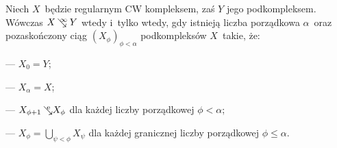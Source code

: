 \begin{lem}\label{lem-charakteryzacja_inf_zgniatalnosci}
Niech $X$~będzie regularnym CW kompleksem, zaś $Y$ jego podkompleksem. Wówczas $X\infcoll Y$ wtedy i~tylko wtedy, gdy istnieją liczba porządkowa $\alpha$~oraz pozaskończony ciąg $\left(X_\phi\right)_{\phi<\alpha}$ podkompleksów $X$~takie, że:
\begin{compactitem}
\item[---] $X_0=Y$;
\item[---] $X_\alpha=X$;
\item[---] $X_{\phi+1}\mbox{$\hspace{2pt}\searrow\hspace{-9pt}^\mathrm{e}\hspace{2pt}$} X_{\phi}$ dla każdej liczby porządkowej $\phi<\alpha$;
\item[---] $X_{\phi}=\bigcup_{\psi<\phi} X_{\psi}$ dla każdej granicznej liczby porządkowej $\phi\leq\alpha$.
\end{compactitem}
\end{lem}
